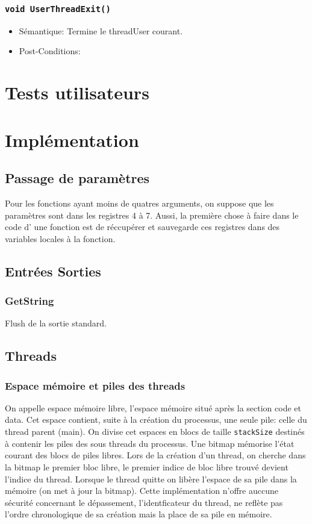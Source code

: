\documentclass[11pt]{article}
\begin{document}
\subsubsection{\texttt{void UserThreadExit()}}
\begin{itemize}
\item[] Sémantique: Termine le threadUser courant.
\item[] Post-Conditions: 
\end{itemize}



\section{Tests utilisateurs}












\section{Implémentation}
\subsection{Passage de paramètres}
Pour les fonctions ayant moins de quatres arguments, on suppose que les paramètres sont dans les registres 4 à 7.
Aussi, la première chose à faire dans le code d' une fonction est de réccupérer et sauvegarde ces registres dans des variables
locales à la fonction.

\subsection{Entrées Sorties}
\subsubsection{GetString}
Flush de la sortie standard.

\subsection{Threads}
\subsubsection{Espace mémoire et piles des threads}
On appelle espace mémoire libre, l'espace mémoire situé après la section code et data.
Cet espace contient, suite à la création du processus, une seule pile: celle du thread parent (main).
On divise cet espaces en blocs de taille \texttt{stackSize} destinés à contenir les piles des sous threads du processus.
Une bitmap mémorise l'état courant des blocs de piles libres. Lors de la création d'un thread, on cherche dans la bitmap le
premier bloc libre, le premier indice de bloc libre trouvé devient l'indice du thread.
Lorsque le thread quitte on libère l'espace de sa pile dans la mémoire (on met à jour la bitmap).
Cette implémentation n'offre auccune sécurité concernant le dépassement, l'identficateur du thread, ne reflète pas l'ordre
chronologique de sa création mais la place de sa pile en mémoire.
\end{document}
